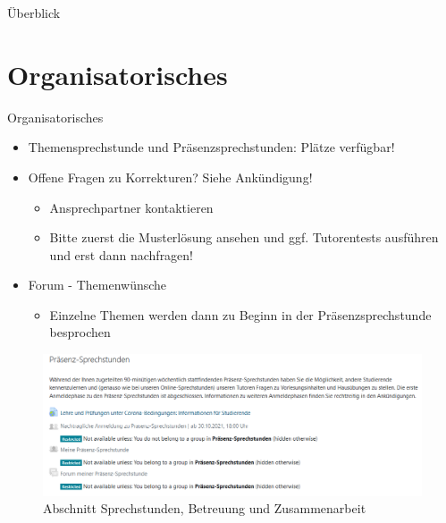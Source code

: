 \documentclass{../tuda-beamer}
\date{03. November 2021}
\begin{document}
    \maketitle

    \begin{frame}{Überblick}
        \tableofcontents
    \end{frame}


    \section{Organisatorisches}
    \begin{frame}{Organisatorisches}
        \begin{itemize}
            \item Themensprechstunde und Präsenzsprechstunden: Plätze verfügbar!
            \item Offene Fragen zu Korrekturen? Siehe Ankündigung!
            \begin{itemize}
                \item Ansprechpartner kontaktieren
                \item Bitte zuerst die Musterlösung ansehen und ggf. Tutorentests ausführen und
                erst dann nachfragen!
            \end{itemize}
            \item Forum - Themenwünsche
            \begin{itemize}
                \item Einzelne Themen werden dann zu Beginn in der Präsenzsprechstunde besprochen
            \end{itemize}
        \end{itemize}
    \end{frame}

    \begin{frame}[c]
        \begin{figure}[h]
            \centering
            \includegraphics[width=\linewidth]{graphics/pss_forum.png}
            \caption{Abschnitt Sprechstunden, Betreuung und Zusammenarbeit}
        \end{figure}
    \end{frame}
\end{document}
